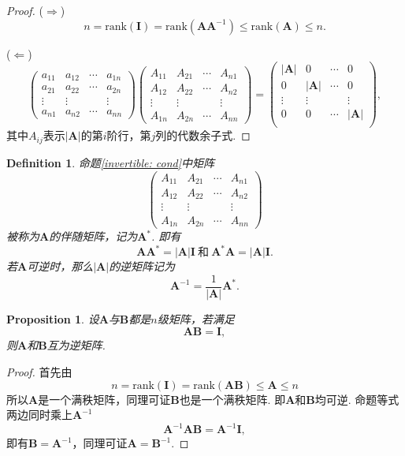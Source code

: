 \documentclass{article}
\newtheorem{proposition}[theorem]{Proposition}
\newtheorem{definition}[theorem]{Definition}
\newcommand{\mbf}[1]{\bm{#1}}
\newcommand{\rank}[1]{\text{rank}(#1)} %
\begin{document}
\begin{proof}
($\Rightarrow$)
$$
n =\rank{\mbf{I}} = \rank{\mbf{A}\mbf{A}^{-1}} \leq \rank{\mbf{A}} \leq n.
$$

($\Leftarrow$)
$$
\begin{pmatrix}
a_{11} & a_{12} & \cdots & a_{1n} \\
a_{21} & a_{22} & \cdots & a_{2n} \\
\vdots & \vdots &&\vdots \\
a_{n1} & a_{n2} & \cdots & a_{nn}
\end{pmatrix}
\begin{pmatrix}
A_{11} & A_{21} & \cdots & A_{n1} \\
A_{12} & A_{22} & \cdots & A_{n2} \\
\vdots & \vdots &&\vdots \\
A_{1n} & A_{2n} & \cdots & A_{nn}
\end{pmatrix}
=\begin{pmatrix}
|\mbf{A}| & 0 & \cdots & 0\\
0 & |\mbf{A}| & \cdots & 0\\
\vdots & \vdots &  & \vdots\\
0 & 0 & \cdots & |\mbf{A}|\\
\end{pmatrix},
$$
其中$A_{ij}$表示$|\mbf{A}|$的第$i$阶行，第$j$列的代数余子式.
\end{proof}

\begin{definition}
\rm 命题\ref{invertible: cond}中矩阵
$$
\begin{pmatrix}
A_{11} & A_{21} & \cdots & A_{n1} \\
A_{12} & A_{22} & \cdots & A_{n2} \\
\vdots & \vdots &&\vdots \\
A_{1n} & A_{2n} & \cdots & A_{nn}
\end{pmatrix}
$$
被称为$\mbf{A}$的伴随矩阵，记为$\mbf{A}^*$. 即有
$$
\mbf{A}\mbf{A}^* = |\mbf{A}|\mbf{I}~\text{和}~\mbf{A}^*\mbf{A} = |\mbf{A}|\mbf{I}.
$$
若$\mbf{A}$可逆时，那么$|\mbf{A}|$的逆矩阵记为
$$
\mbf{A}^{-1} = \frac{1}{|\mbf{A}|}\mbf{A}^*.
$$
\end{definition}

\begin{proposition}\label{invertible: prop1}
\rm 设$\mbf{A}$与$\mbf{B}$都是$n$级矩阵，若满足
$$
\mbf{A} \mbf{B} = \mbf{I},
$$
则$\mbf{A}$和$\mbf{B}$互为逆矩阵.
\end{proposition}

\begin{proof}
首先由
$$
n =\rank{\mbf{I}} =  \rank{\mbf{A} \mbf{B}} \leq \mbf{A} \leq n
$$
所以$\mbf{A}$是一个满秩矩阵，同理可证$\mbf{B}$也是一个满秩矩阵. 即$\mbf{A}$和$\mbf{B}$均可逆. 命题等式两边同时乘上$\mbf{A}^{-1}$
$$
\mbf{A}^{-1}\mbf{A}\mbf{B} = \mbf{A}^{-1}\mbf{I},
$$
即有$\mbf{B} = \mbf{A}^{-1}$，同理可证$\mbf{A} = \mbf{B}^{-1}$.
\end{proof}
\end{document}
